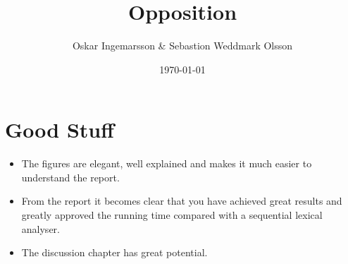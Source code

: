 \documentclass{article}
\title{Opposition}
\author{Oskar Ingemarsson \& Sebastion Weddmark Olsson}
\begin{document}
\date{\today}
\maketitle

\section*{Good Stuff}
\begin{itemize}
\item The figures are elegant, well explained and makes it much easier to
understand the report.
\item From the report it becomes clear that you have achieved great results and
greatly approved the running time compared with a sequential lexical analyser.
\item The discussion chapter has great potential.
\end{itemize}
\end{document}
